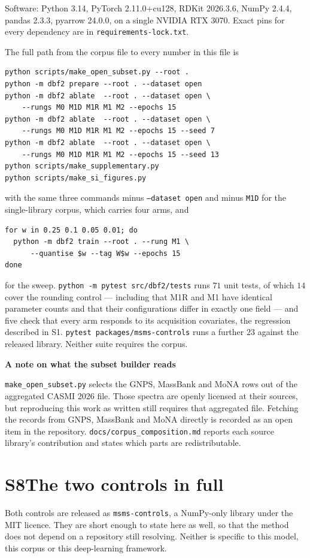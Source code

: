 \documentclass[11pt]{article}
\newcommand{\hd}[1]{\medskip\par\noindent\textbf{#1}\par\nobreak\vspace{2pt}\noindent\ignorespaces}
\begin{document}
Software: Python 3.14, PyTorch 2.11.0+cu128, RDKit 2026.3.6, NumPy 2.4.4, pandas
2.3.3, pyarrow 24.0.0, on a single NVIDIA RTX 3070. Exact pins for every
dependency are in \texttt{requirements-lock.txt}.

The full path from the corpus file to every number in this file is
\begin{verbatim}
python scripts/make_open_subset.py --root .
python -m dbf2 prepare --root . --dataset open
python -m dbf2 ablate  --root . --dataset open \
    --rungs M0 M1D M1R M1 M2 --epochs 15
python -m dbf2 ablate  --root . --dataset open \
    --rungs M0 M1D M1R M1 M2 --epochs 15 --seed 7
python -m dbf2 ablate  --root . --dataset open \
    --rungs M0 M1D M1R M1 M2 --epochs 15 --seed 13
python scripts/make_supplementary.py
python scripts/make_si_figures.py
\end{verbatim}
with the same three commands minus \texttt{--dataset open} and minus \texttt{M1D}
for the single-library corpus, which carries four arms, and
\begin{verbatim}
for w in 0.25 0.1 0.05 0.01; do
  python -m dbf2 train --root . --rung M1 \
      --quantise $w --tag W$w --epochs 15
done
\end{verbatim}
for the sweep. \texttt{python -m pytest src/dbf2/tests} runs $71$ unit tests, of
which $14$ cover the rounding control --- including that M1R and M1 have identical
parameter counts and that their configurations differ in exactly one field --- and
five check that every arm responds to its acquisition covariates, the regression
described in S1. \texttt{pytest packages/msms-controls} runs a further $23$ against
the released library. Neither suite requires the corpus.

\hd{A note on what the subset builder reads}
\texttt{make\_open\_subset.py} selects the GNPS, MassBank and MoNA rows out of the
aggregated CASMI 2026 file. Those spectra are openly licensed at their sources, but
reproducing this work as written still requires that aggregated file. Fetching the
records from GNPS, MassBank and MoNA directly is recorded as an open item in the
repository. \texttt{docs/corpus\_composition.md} reports each source library's
contribution and states which parts are redistributable.

\section*{S8\quad The two controls in full}

Both controls are released as \texttt{msms-controls}, a NumPy-only library under
the MIT licence. They are short enough to state here as well, so that the method
does not depend on a repository still resolving. Neither is specific to this
model, this corpus or this deep-learning framework.
\end{document}
